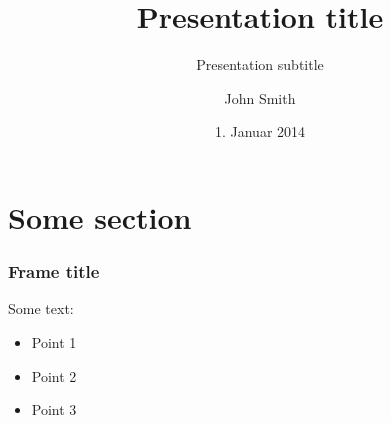 \documentclass[10pt]{beamer}
\title{Presentation title}
\subtitle{Presentation subtitle}
\author[J. Smith]{John Smith}
\date[01.01.2014]{1. Januar 2014}
\begin{document}
\titleframe

\tocframe[hideallsubsections]


\section{Some section}

\begin{frame}
\frametitle{Frame title}
Some text:
\begin{itemize}
\item Point 1
\item Point 2
\item Point 3
\end{itemize}
\end{frame}


\signatureframe
\end{document}
